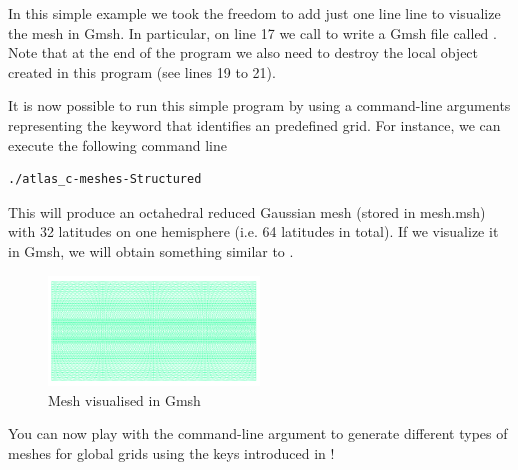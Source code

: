In this simple example we took the freedom to add just one line 
line to visualize the mesh in Gmsh. In particular, on line 17 
we call  to write a Gmsh file called 
. Note that at the end of the program we also 
need to destroy the local object created in this program (see 
lines 19 to 21).

It is now possible to run this simple program by using 
a command-line arguments representing the keyword that 
identifies an \Atlas predefined grid. For instance, 
we can execute the following command line
%
\begin{lstlisting}[style=BashStyle]
./atlas_c-meshes-Structured
\end{lstlisting}
% 
This will produce an octahedral reduced Gaussian mesh 
(stored in mesh.msh) with 32 latitudes on one hemisphere 
(i.e. 64 latitudes in total).
If we visualize it in Gmsh, we will obtain something similar
to .
%
\begin{figure}%
\centering
\includegraphics[width=0.5\textwidth]{imgs/O32-2D.png}
\caption{Mesh visualised in Gmsh}%
\label{fig:meshes-f}%
\end{figure}
%
You can now play with the command-line argument to generate 
different types of meshes for global grids using the keys 
introduced in !
